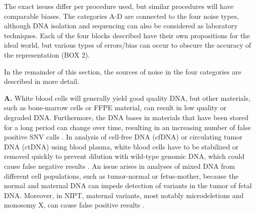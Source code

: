 The exact issues differ per procedure used, but similar procedures will have comparable biases. The categories A-D are connected to the four noise types, although DNA isolation and sequencing can also be considered as laboratory techniques. 
Each of the four blocks described have their own propositions for the ideal world, but various types of errors/bias can occur to obscure the accuracy of the representation (BOX 2). 

In the remainder of this section, the sources of noise in the four categories are described in more detail.

\textbf{A.} White blood cells will generally yield good quality DNA, but other materials, such as bone-marrow cells or FFPE material, can result in low quality or degraded DNA. 
Furthermore, the DNA bases in materials that have been stored for a long period can change over time, resulting in an increasing number of false positive SNV calls \cite{Guyard_2017}. 
In analysis of cell-free DNA (cfDNA) or circulating tumor DNA (ctDNA) using blood plasma, white blood cells have to be stabilized or removed quickly to prevent dilution with wild-type genomic DNA, which could cause false negative results \cite{Medina_Diaz_2016}. 
An issue arises in analyses of mixed DNA from different cell populations, such as tumor-normal or fetus-mother, because the normal and maternal DNA can impede detection of variants in the tumor of fetal DNA. 
Moreover, in NIPT, maternal variants, most notably microdeletions and monosomy X, can cause false positive results \cite{Mather_2016,Reiss_2017}. 


